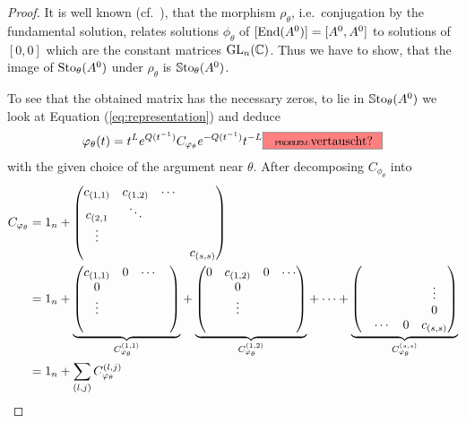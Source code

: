 \begin{proof}
  It is well known (cf.\ \cite[10]{thboalch}), that the morphism
  $\rho_{\theta}$, i.e.\ conjugation by the fundamental solution, relates
  solutions $\phi_\theta$ of $[\operatorname{End}(A^0)]=[A^0,A^0]$ to solutions of $[0,0]$
  which are the constant matrices $\operatorname{GL}_n(\mathbb{C})$.
  Thus we have to show, that the image of $\operatorname{Sto}_\theta(A^0)$ under
  $\rho_{\theta}$ is $\operatorname{\mathbb{S}to}_\theta(A^0)$.

  To see that the obtained matrix has the necessary zeros, to lie in
  $\operatorname{\mathbb{S}to}_{\theta}(A^0)$ we look at Equation (\ref{eq:representation}) and
  deduce
  \begin{equation}\label{eq:repProof1}
    \phi_\theta(t)
    =t^L e^{Q(t^{-1})}C_{\phi_\theta}e^{-Q(t^{-1})}t^{-L}
    \PROBLEM[vertauscht?]
  \end{equation}
  with the given choice of the argument near $\theta$.
  After decomposing $C_{\phi_\theta}$ into
  \begin{align*}
    C_{\phi_\theta}&=1_n+\begin{pmatrix}
      c_{(1,1)} & c_{(1,2)} & \cdots &\\
      c_{(2,1} & \ddots\\
      \vdots \\
      & & & c_{(s,s)}
    \end{pmatrix}
  \\&=1_n+
    \underset{C_{\phi_\theta}^{(1,1)}}{\underbrace{%
      \begin{pmatrix}
        c_{(1,1)} & 0 & \cdots &\\
        0\\
        \vdots&\\
        &
      \end{pmatrix}
    }}
    +
    \underset{C_{\phi_\theta}^{(1,2)}}{\underbrace{%
      \begin{pmatrix}
        0 & c_{(1,2)} & 0 & \cdots\\
        & 0 &\\
        &\vdots\\
        &
      \end{pmatrix}
    }}
    +\cdots+
    \underset{C_{\phi_\theta}^{(s,s)}}{\underbrace{%
      \begin{pmatrix}
        &\\
        & & & \vdots\\
        & & & 0\\
        & \cdots & 0 & c_{(s,s)}
      \end{pmatrix}
    }}
  \\&=1_n+\sum_{(l,j)}C_{\phi_\theta}^{(l,j)}

\end{align*}
\end{proof}
